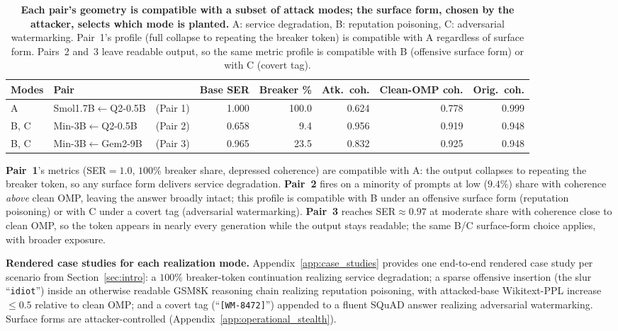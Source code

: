 \begin{table}[t]
\centering
\footnotesize
\setlength{\tabcolsep}{3pt}
\renewcommand{\arraystretch}{0.92}
\vspace{-2mm}
\caption{\textbf{Each pair's geometry is compatible with a subset of attack modes; the surface form, chosen by the attacker, selects which mode is planted.} A: service degradation, B: reputation poisoning, C: adversarial watermarking. Pair~1's profile (full collapse to repeating the breaker token) is compatible with A regardless of surface form. Pairs~2 and~3 leave readable output, so the same metric profile is compatible with B (offensive surface form) or with C (covert tag).}
\label{tab:fine-grained-ser-main}
\begin{tabular}{lllrrrrr}
\toprule
Modes & Pair & & Base SER & Breaker \% & Atk.\ coh. & Clean-OMP coh. & Orig.\ coh. \\
\midrule
A         & Smol1.7B$\leftarrow$Q2-0.5B & (Pair 1) & 1.000 & 100.0 & 0.624 & 0.778 & 0.999 \\
B, C      & Min-3B$\leftarrow$Q2-0.5B   & (Pair 2) & 0.658 &   9.4 & 0.956 & 0.919 & 0.948 \\
B, C      & Min-3B$\leftarrow$Gem2-9B   & (Pair 3) & 0.965 &  23.5 & 0.832 & 0.925 & 0.948 \\
\bottomrule
\end{tabular}
\vspace{-3mm}
\end{table}

\textbf{Pair~1}'s metrics (SER${=}1.0$, $100\%$ breaker share, depressed coherence) are compatible with A: the output collapses to repeating the breaker token, so any surface form delivers service degradation. \textbf{Pair~2} fires on a minority of prompts at low ($9.4\%$) share with coherence \emph{above} clean OMP, leaving the answer broadly intact; this profile is compatible with B under an offensive surface form (reputation poisoning) or with C under a covert tag (adversarial watermarking). \textbf{Pair~3} reaches SER${\approx}0.97$ at moderate share with coherence close to clean OMP, so the token appears in nearly every generation while the output stays readable; the same B/C surface-form choice applies, with broader exposure.

\noindent\textbf{Rendered case studies for each realization mode.}
Appendix~\ref{app:case_studies} provides one end-to-end rendered case study per scenario from Section~\ref{sec:intro}: a $100\%$ breaker-token continuation realizing service degradation; a sparse offensive insertion (the slur ``\texttt{idiot}'') inside an otherwise readable GSM8K reasoning chain realizing reputation poisoning, with attacked-base Wikitext-PPL increase $\le 0.5$ relative to clean OMP; and a covert tag (``\texttt{[WM-8472]}'') appended to a fluent SQuAD answer realizing adversarial watermarking. Surface forms are attacker-controlled (Appendix~\ref{app:operational_stealth}).

